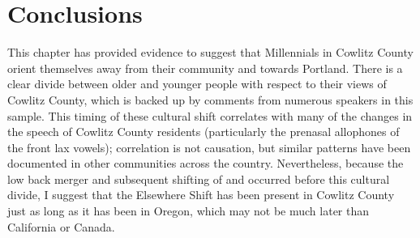 \section{Conclusions}

This chapter has provided evidence to suggest that Millennials in Cowlitz County orient themselves away from their community and towards Portland. There is a clear divide between older and younger people with respect to their views of Cowlitz County, which is backed up by comments from numerous speakers in this sample. This timing of these cultural shift correlates with many of the changes in the speech of Cowlitz County residents (particularly the prenasal allophones of the front lax vowels); correlation is not causation, but similar patterns have been documented in other communities across the country. Nevertheless, because the low back merger and subsequent shifting of \bat and \ben occurred before this cultural divide, I suggest that the Elsewhere Shift has been present in Cowlitz County just as long as it has been in Oregon, which may not be much later than California or Canada.
